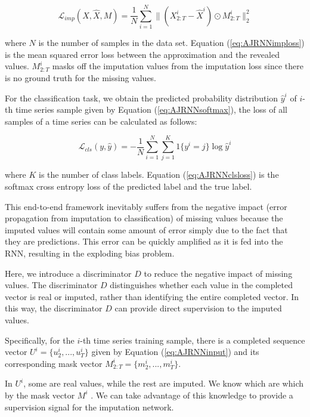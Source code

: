 \begin{equation}
  \mathcal{L}_{imp}(X, \hat{X}, M) = \frac{1}{N} \sum_{i=1}^N \lVert (X^i_{2:T} - \hat{X}^i) \odot M^i_{2:T} \rVert_2^2
  \label{eq:AJRNNimploss}
\end{equation}

where $N$ is the number of samples in the data set.
Equation (\ref{eq:AJRNNimploss}) is the mean squared error loss between the approximation and the revealed values.
$ M^i_{2:T}$ masks off the imputation values from the imputation loss since there is no ground truth for the missing values.

For the classification task, we obtain the predicted probability distribution $\hat{y}^i$ of $i$-th time series sample given by
Equation (\ref{eq:AJRNNsoftmax}), the loss of all samples of a time series can be calculated as follows:

\begin{equation}
  \mathcal{L}_{cls}(y, \hat{y}) = - \frac{1}{N} \sum_{i=1}^N \sum_{j=1}^K 1\{ y^i = j\} \log\hat{y}^i 
  \label{eq:AJRNNclsloss}
\end{equation}

where $K$ is the number of class labels. Equation (\ref{eq:AJRNNclsloss}) is the softmax cross entropy loss of the predicted label and the true label.

This end-to-end framework inevitably suffers from the negative impact (error propagation from imputation to classification) of missing values because the imputed values will contain some amount of error simply due to the fact that they are predictions.
This error can be quickly amplified as it is fed into the RNN, resulting in the exploding bias problem.

Here, we introduce a discriminator $D$ to reduce the negative impact of missing values. 
The discriminator $D$ distinguishes whether each value in the completed vector is real or imputed, rather than identifying the entire completed vector. 
In this way, the discriminator $D$ can provide direct supervision to the imputed values.

Specifically, for the $i$-th time series training sample, there is a completed sequence vector $U^i = \{u^i_2 , ..., u^i_T\}$
given by Equation (\ref{eq:AJRNNinput}) and its corresponding mask vector $M^i_{2:T} = \{m^i_2, ..., m^i_T \}$.

In $U^i$, some are real values, while the rest are imputed.
We know which are which by the mask vector $M^i$ . We can take advantage of this knowledge to provide a supervision signal for the imputation network.


